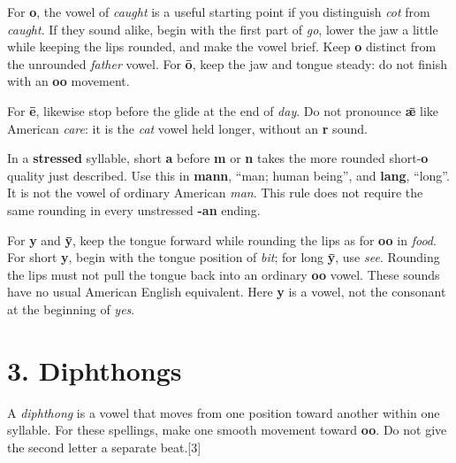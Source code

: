 For \textbf{o}, the vowel of \emph{caught} is a useful starting point if you distinguish \emph{cot} from \emph{caught}. If they sound alike, begin with the first part of \emph{go}, lower the jaw a little while keeping the lips rounded, and make the vowel brief. Keep \textbf{o} distinct from the unrounded \emph{father} vowel. For \textbf{ō}, keep the jaw and tongue steady: do not finish with an \textbf{oo} movement.

For \textbf{ē}, likewise stop before the glide at the end of \emph{day}. Do not pronounce \textbf{ǣ} like American \emph{care}: it is the \emph{cat} vowel held longer, without an \textbf{r} sound.

In a \textbf{stressed} syllable, short \textbf{a} before \textbf{m} or \textbf{n} takes the more rounded short-\textbf{o} quality just described. Use this in \textbf{mann}, “man; human being”, and \textbf{lang}, “long”. It is not the vowel of ordinary American \emph{man}. This rule does not require the same rounding in every unstressed \textbf{-an} ending.

For \textbf{y} and \textbf{ȳ}, keep the tongue forward while rounding the lips as for \textbf{oo} in \emph{food}. For short \textbf{y}, begin with the tongue position of \emph{bit}; for long \textbf{ȳ}, use \emph{see}. Rounding the lips must not pull the tongue back into an ordinary \textbf{oo} vowel. These sounds have no usual American English equivalent. Here \textbf{y} is a vowel, not the consonant at the beginning of \emph{yes}.

\section*{3. Diphthongs}

A \emph{diphthong} is a vowel that moves from one position toward another within one syllable. For these spellings, make one smooth movement toward \textbf{oo}. Do not give the second letter a separate beat.[3]

